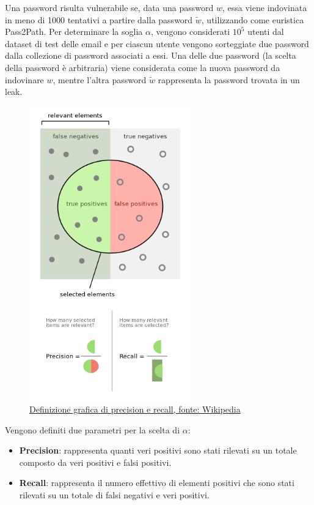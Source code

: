 Una password risulta vulnerabile se, data una password $w$, essa viene indovinata in meno di 1000 tentativi a partire dalla password $\tilde{w}$, utilizzando come euristica Pass2Path.
Per determinare la soglia $\alpha$, vengono considerati $10^5$ utenti dal dataset di test delle email e per ciascun utente vengono sorteggiate due password dalla collezione di password associati a essi. Una delle due password (la scelta della password è arbitraria) viene considerata come la nuova password da indovinare $w$, mentre l'altra password $\tilde{w}$ rappresenta la password trovata in un leak.
\begin{figure}[h!]
    \centering
    \includegraphics[width=7cm]{./immagini/precisionrecall.png}
    \caption{\href{https://upload.wikimedia.org/wikipedia/commons/2/26/Precisionrecall.svg}{Definizione grafica di precision e recall, fonte: Wikipedia}}
    \label{precision recall}
\end{figure}
\FloatBarrier
Vengono definiti due parametri per la scelta di $\alpha$:
\begin{itemize}
    \item \textbf{Precision}: rappresenta quanti veri positivi sono stati rilevati su un totale composto da veri positivi e falsi positivi.
    \item \textbf{Recall}: rappresenta il numero effettivo di elementi positivi che sono stati rilevati su un totale di falsi negativi e veri positivi.
\end{itemize}
